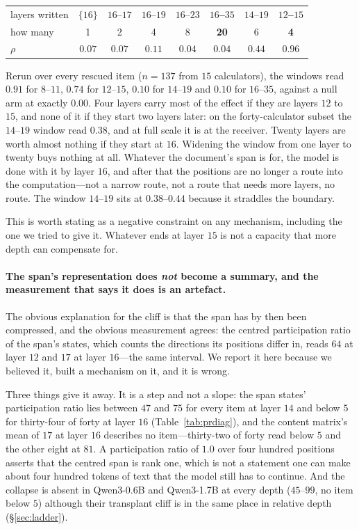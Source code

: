 \documentclass{article}
\begin{document}
\begin{center}
\begin{tabular}{@{}lccccccc@{}}
\toprule
layers written & $\{16\}$ & $16$--$17$ & $16$--$19$ & $16$--$23$ &
\textbf{$16$--$35$} & $14$--$19$ & \textbf{$12$--$15$} \\
how many & 1 & 2 & 4 & 8 & \textbf{20} & 6 & \textbf{4} \\
\midrule
$\rho$ & $0.07$ & $0.07$ & $0.11$ & $0.04$ & $\mathbf{0.04}$ & $0.44$ &
$\mathbf{0.96}$ \\
\bottomrule
\end{tabular}
\end{center}

Rerun over every rescued item ($n=137$ from $15$ calculators), the windows read
$0.91$ for $8$--$11$, $0.74$ for $12$--$15$, $0.10$ for $14$--$19$ and $0.10$ for
$16$--$35$, against a null arm at exactly $0.00$. Four layers carry most of the
effect if they are layers $12$ to $15$, and none of it if they start two layers
later: on the forty-calculator subset the $14$--$19$ window read $0.38$, and at
full scale it is at the receiver. Twenty layers are worth almost nothing if they start at $16$. Widening the window from one layer to
twenty buys nothing at all. Whatever the document's span is for, the model is
done with it by layer $16$, and after that the positions are no longer a route
into the computation---not a narrow route, not a route that needs more layers,
no route. The window $14$--$19$ sits at $0.38$--$0.44$ because it
straddles the boundary.

This is worth stating as a negative constraint on any mechanism, including the
one we tried to give it. Whatever ends at layer $15$ is not a capacity that more
depth can compensate for.

\paragraph{The span's representation does \emph{not} become a summary, and the
measurement that says it does is an artefact.} The obvious explanation for the
cliff is that the span has by then been compressed, and the obvious measurement
agrees: the centred participation ratio of the span's states, which counts the
directions its positions differ in, reads $64$ at layer $12$ and $17$ at layer
$16$---the same interval. We report it here because we believed it, built a
mechanism on it, and it is wrong.

Three things give it away. It is a step and not a slope: the span states'
participation ratio lies between $47$ and $75$ for every item at layer $14$ and
below $5$ for thirty-four of forty at layer $16$ (Table~\ref{tab:prdiag}), and
the content matrix's mean of $17$ at layer $16$ describes no item---thirty-two
of forty read below $5$ and the other eight at $81$. A participation ratio of
$1.0$ over four hundred positions asserts that the centred span is rank one,
which is not a statement one can make about four hundred tokens of text that
the model still has to continue. And the collapse is absent in Qwen3-0.6B and
Qwen3-1.7B at every depth ($45$--$99$, no item below $5$) although their
transplant cliff is in the same place in relative depth
(\S\ref{sec:ladder}).
\end{document}
